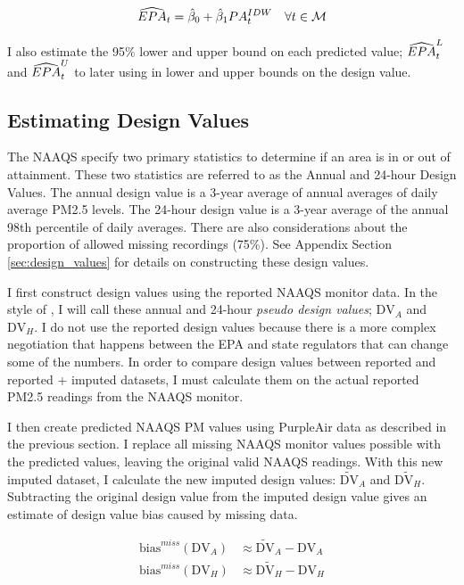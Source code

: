 \documentclass[12pt]{article}
\begin{document}
\begin{equation}
\widehat{EPA}_t = \hat\beta_0 + \hat\beta_1 PA^{IDW}_t \quad \forall t\in\mathcal{M}
\end{equation}

I also estimate the 95\% lower and upper bound on each predicted value; $\widehat{EPA}^L_t$ and $\widehat{EPA}^U_t$ to later using in lower and upper bounds on the design value.

\subsection{Estimating Design Values} \label{design_value_equations}
The NAAQS specify two primary statistics to determine if an area is in or out of attainment. These two statistics are referred to as the Annual and 24-hour Design Values. The annual design value is a 3-year average of annual averages of daily average PM2.5 levels. The 24-hour design value is a 3-year average of the annual 98th percentile of daily averages. There are also considerations about the proportion of allowed missing recordings (75\%). See Appendix Section \ref{sec:design_values} for details on constructing these design values.

\def\dva{\text{DV}_A}\def\dvh{\text{DV}_H}
\def\dvaa{\widetilde{\text{DV}}_A}\def\dvhh{\widetilde{\text{DV}_H}}
I first construct design values using the reported NAAQS monitor data. In the style of \cite{fowlieBringingSatelliteBasedAir2019}, I will call these annual and 24-hour \textit{pseudo design values}; $\dva$ and $\dvh$. I do not use the reported design values because there is a more complex negotiation that happens between the EPA and state regulators that can change some of the numbers. In order to compare design values between reported and reported + imputed datasets, I must calculate them on the actual reported PM2.5 readings from the NAAQS monitor.

I then create predicted NAAQS PM values using PurpleAir data as described in the previous section. I replace all missing NAAQS monitor values possible with the predicted values, leaving the original valid NAAQS readings. With this new imputed dataset, I calculate the new imputed design values: $\dvaa$ and $\dvhh$. Subtracting the original design value from the imputed design value gives an estimate of design value bias caused by missing data.

\begin{align}
    \text{bias}^{miss}(\dva) &\approx \dvaa - \dva\\
    \text{bias}^{miss}(\dvh) &\approx \dvhh - \dvh
\end{align}
\end{document}
